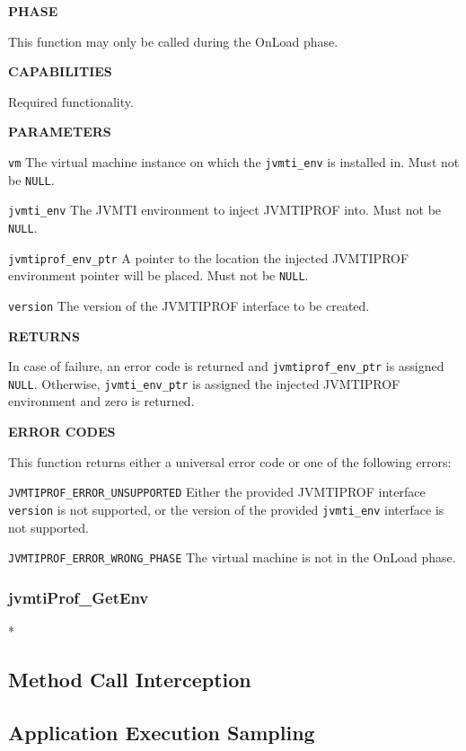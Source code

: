 \bigskip
\noindent \textbf{PHASE}

This function may only be called during the OnLoad phase.

\bigskip
\noindent \textbf{CAPABILITIES}

Required functionality.

\bigskip
\noindent \textbf{PARAMETERS}

\texttt{vm} The virtual machine instance on which the \texttt{jvmti\_env} is installed in. Must not be \texttt{NULL}.

\texttt{jvmti\_env} The JVMTI environment to inject JVMTIPROF into. Must not be \texttt{NULL}.

\texttt{jvmtiprof\_env\_ptr} A pointer to the location the injected JVMTIPROF environment pointer will be placed. Must not be \texttt{NULL}.

\texttt{version} The version of the JVMTIPROF interface to be created.

\bigskip
\noindent \textbf{RETURNS} 

In case of failure, an error code is returned and \texttt{jvmtiprof\_env\_ptr} is assigned \texttt{NULL}. Otherwise, \texttt{jvmti\_env\_ptr} is assigned the injected JVMTIPROF environment and zero is returned.

\bigskip
\noindent \textbf{ERROR CODES} 

This function returns either a universal error code or one of the following errors:
\smallskip

\hspace{\parindent} \texttt{JVMTIPROF\_ERROR\_UNSUPPORTED} Either the provided JVMTIPROF interface \texttt{version} is not supported, or the version of the provided \texttt{jvmti\_env} interface is not supported.

\hspace{\parindent} \texttt{JVMTIPROF\_ERROR\_WRONG\_PHASE} The virtual machine is not in the OnLoad phase.

\subsubsection*{jvmtiProf\_GetEnv} *


\subsection{Method Call Interception}

\subsection{Application Execution Sampling}

